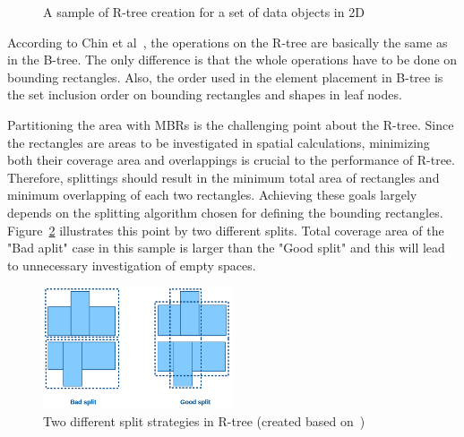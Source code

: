 \documentclass[a4paper,12pt]{article}
\begin{document}
\begin{figure}
\centering
{}
\centering
{}
\caption{A sample of R-tree creation for a set of data objects in 2D}
\label{rtree}
\end{figure}

According to Chin et al~\cite{survey}, the operations on the R-tree 
are basically the same as in the B-tree. The only difference is that the 
whole operations have to be done on bounding rectangles.
Also, the order used in the element placement in B-tree
is the set inclusion order on bounding rectangles and shapes in leaf nodes. 

Partitioning the area with MBRs is the challenging point about the R-tree. 
Since the rectangles are areas to be investigated in spatial calculations, minimizing both their coverage area and overlappings is crucial to the performance of R-tree. Therefore, splittings should result in the minimum total area of rectangles and minimum overlapping of each two rectangles. 
Achieving these goals largely depends on the splitting algorithm chosen for defining the bounding rectangles. Figure~\ref{rtreesplit} illustrates this point by two different splits. Total coverage area of the "Bad aplit" case in this sample is larger than the "Good split" and this will lead to unnecessary investigation of empty spaces.

\begin{figure}
\centering
\includegraphics[width=0.5\textwidth,height=0.17\textheight]{R-treeMBR}
\caption{Two different split strategies in R-tree (created based on~\cite{rtree})}
\label{rtreesplit}
\end{figure}
\end{document}
